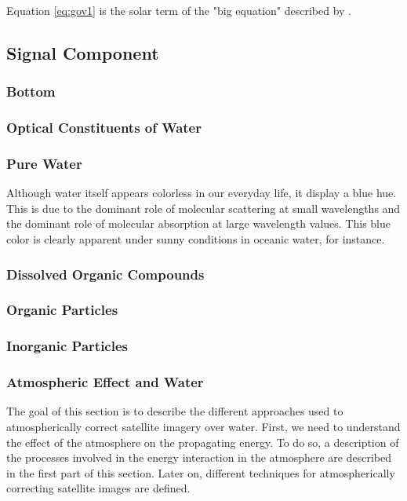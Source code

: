 Equation \eqref{eq:gov1} is the solar term of the "big equation" described by \cite{Schott}.



\subsection{Signal Component}
\subsubsection{Bottom}
\subsubsection{Optical Constituents of Water}
\subsubsection*{Pure Water}
Although water itself appears colorless in our everyday life, it display a blue hue. This is due to the dominant role of molecular scattering at small wavelengths and the dominant role of molecular absorption at large wavelength values. This blue color is clearly apparent under sunny conditions in oceanic water, for instance.
\subsubsection*{Dissolved Organic Compounds}
\subsubsection*{Organic Particles}
\subsubsection*{Inorganic Particles}
\subsubsection{Atmospheric Effect and Water} 
The goal of this section is to describe the different approaches used to atmospherically correct satellite imagery over water. First, we need to understand the effect of the atmosphere on the propagating energy. To do so, a description of the processes involved in the energy interaction in the atmosphere are described in the first part of this section. Later on, different techniques for atmospherically correcting satellite images are defined.

